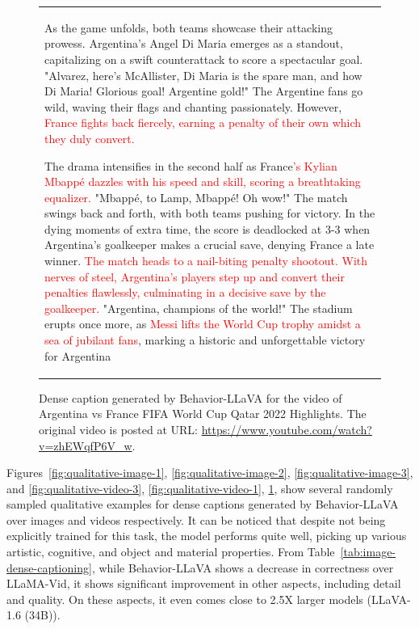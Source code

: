 \begin{landscape}
\begin{figure}[t]
\begin{minipage}[c]{0.8\textwidth}
\begin{tabular}{p{12cm}}
        As the game unfolds, both teams showcase their attacking prowess. Argentina's Angel Di Maria emerges as a standout, capitalizing on a swift counterattack to score a spectacular goal. "Alvarez, here's McAllister, Di Maria is the spare man, and how Di Maria! Glorious goal! Argentine gold!" The Argentine fans go wild, waving their flags and chanting passionately. However, \textcolor{red}{France fights back fiercely, earning a penalty of their own which they duly convert.}
        
        The drama intensifies in the second half as France\textcolor{red}{'s Kylian Mbappé dazzles with his speed and skill, scoring a breathtaking equalizer.} "Mbappé, to Lamp, Mbappé! Oh wow!" The match swings back and forth, with both teams pushing for victory. In the dying moments of extra time, the score is deadlocked at 3-3 when Argentina's goalkeeper makes a crucial save, denying France a late winner. \textcolor{red}{The match heads to a nail-biting penalty shootout. With nerves of steel, Argentina's players step up and convert their penalties flawlessly, culminating in a decisive save by the goalkeeper.} "Argentina, champions of the world!" The stadium erupts once more, as \textcolor{red}{Messi lifts the World Cup trophy amidst a sea of jubilant fans}, marking a historic and unforgettable victory for Argentina
    \end{tabular}
    \end{minipage}
    \caption{Dense caption generated by Behavior-LLaVA for the video of Argentina vs France FIFA World Cup Qatar 2022 Highlights. The original video is posted at URL: \url{https://www.youtube.com/watch?v=zhEWqfP6V_w}.}
    \label{fig:qualitative-video-2}
    \end{figure}

\end{landscape}









Figures~\ref{fig:qualitative-image-1}, \ref{fig:qualitative-image-2}, \ref{fig:qualitative-image-3}, and \ref{fig:qualitative-video-3}, \ref{fig:qualitative-video-1}, \ref{fig:qualitative-video-2}, show several randomly sampled qualitative examples for dense captions generated by Behavior-LLaVA over images and videos respectively. It can be noticed that despite not being explicitly trained for this task, the model performs quite well, picking up various artistic, cognitive, and object and material properties. From Table~\ref{tab:image-dense-captioning}, while Behavior-LLaVA shows a decrease in correctness over LLaMA-Vid, it shows significant improvement in other aspects, including detail and quality. On these aspects, it even comes close to 2.5X larger models (LLaVA-1.6 (34B)).

